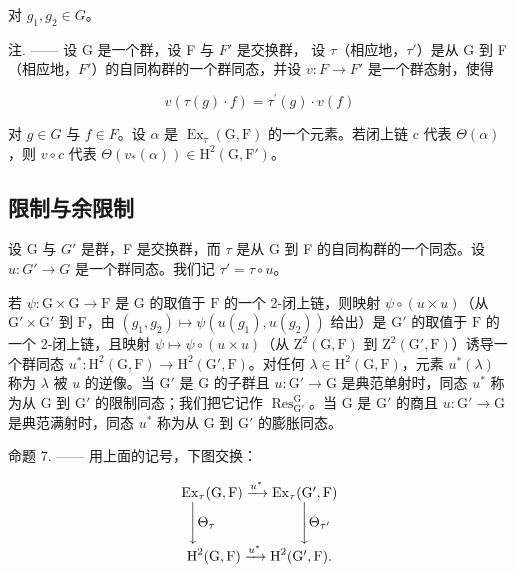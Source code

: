 对 \(g_{1}, g_{2} \in G\)。

注. —— 设 G 是一个群，设 F 与 \(F'\) 是交换群， 设 \(\tau\)（相应地，\(\tau'\)）是从 G 到 F（相应地，\(F'\)）的自同构群的一个群同态，并设 \(v : F \to F'\) 是一个群态射，使得

\[
v (\tau (g) \cdot f) = \tau^ {\prime} (g) \cdot v (f)\tag{13}
\]

对 \(g \in G\) 与 \(f \in F\)。设 \(\alpha\) 是 \(\operatorname{Ex}_{\tau}(\mathrm{G}, \mathrm{F})\) 的一个元素。若闭上链 c 代表 \(\Theta(\alpha)\)，则 \(v \circ c\) 代表 \(\Theta(v_{*}(\alpha)) \in \mathrm{H}^{2}(\mathrm{G}, \mathrm{F}')\)。

\subsection{限制与余限制}

设 G 与 \(G'\) 是群，F 是交换群，而 \(\tau\) 是从 G 到 F 的自同构群的一个同态。设 \(u: G' \to G\) 是一个群同态。我们记 \(\tau' = \tau \circ u\)。

若 \(\psi : \mathrm{G} \times \mathrm{G} \to \mathrm{F}\) 是 \(\mathrm{G}\) 的取值于 \(\mathrm{F}\) 的一个 2-闭上链，则映射 \(\psi \circ (u \times u)\)（从 \(\mathrm{G}' \times \mathrm{G}'\) 到 \(\mathrm{F}\)，由 \((g_1, g_2) \mapsto \psi(u(g_1), u(g_2))\) 给出）是 \(\mathrm{G}'\) 的取值于 \(\mathrm{F}\) 的一个 2-闭上链，且映射 \(\psi \mapsto \psi \circ (u \times u)\)（从 \(\mathrm{Z}^2(\mathrm{G}, \mathrm{F})\) 到 \(\mathrm{Z}^2(\mathrm{G}', \mathrm{F})\)）诱导一个群同态 \(u^*: \mathrm{H}^2(\mathrm{G}, \mathrm{F}) \to \mathrm{H}^2(\mathrm{G}', \mathrm{F})\)。对任何 \(\lambda \in \mathrm{H}^2(\mathrm{G}, \mathrm{F})\)，元素 \(u^*(\lambda)\) 称为 \(\lambda\) 被 \(u\) 的逆像。当 \(\mathrm{G}'\) 是 \(\mathrm{G}\) 的子群且 \(u: \mathrm{G}' \to \mathrm{G}\) 是典范单射时，同态 \(u^*\) 称为从 \(\mathrm{G}\) 到 \(\mathrm{G}'\) 的限制同态；我们把它记作 \(\operatorname{Res}_{\mathrm{G}'}^{\mathrm{G}}\)。当 \(\mathrm{G}\) 是 \(\mathrm{G}'\) 的商且 \(u: \mathrm{G}' \to \mathrm{G}\) 是典范满射时，同态 \(u^*\) 称为从 \(\mathrm{G}\) 到 \(\mathrm{G}'\) 的膨胀同态。

命题 7. —— 用上面的记号，下图交换：

\[
\begin{array}{c} \operatorname{Ex} _ {\tau} (\mathrm{G}, \mathrm{F}) \xrightarrow {u ^ {*}} \operatorname{Ex} _ {\tau} (\mathrm{G} ^ {\prime}, \mathrm{F}) \\ \Biggl \downarrow \Theta_ {\tau} \qquad \qquad \qquad \Biggl \downarrow \Theta_ {\tau^ {\prime}} \\ \operatorname{H} ^ {2} (\mathrm{G}, \mathrm{F}) \xrightarrow {u ^ {*}} \operatorname{H} ^ {2} (\mathrm{G} ^ {\prime}, \mathrm{F})  . \end{array}
\]

